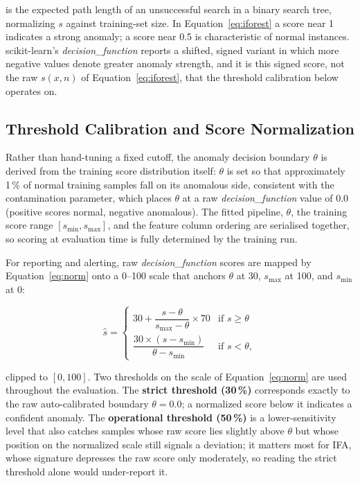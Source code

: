 \noindent is the expected path length of an unsuccessful search in a binary search tree, normalizing $s$ against training-set size. In Equation~\eqref{eq:iforest} a score near 1 indicates a strong anomaly; a score near 0.5 is characteristic of normal instances. scikit-learn's \textit{decision\_function} reports a shifted, signed variant in which more negative values denote greater anomaly strength, and it is this signed score, not the raw $s(x,n)$ of Equation~\eqref{eq:iforest}, that the threshold calibration below operates on.

\subsection{Threshold Calibration and Score Normalization}

Rather than hand-tuning a fixed cutoff, the anomaly decision boundary $\theta$ is derived from the training score distribution itself: $\theta$ is set so that approximately 1\,\% of normal training samples fall on its anomalous side, consistent with the contamination parameter, which places $\theta$ at a raw \textit{decision\_function} value of $0.0$ (positive scores normal, negative anomalous). The fitted pipeline, $\theta$, the training score range $[s_{\min}, s_{\max}]$, and the feature column ordering are serialised together, so scoring at evaluation time is fully determined by the training run.

For reporting and alerting, raw \textit{decision\_function} scores are mapped by Equation~\eqref{eq:norm} onto a 0--100 scale that anchors $\theta$ at 30, $s_{\max}$ at 100, and $s_{\min}$ at 0:

\begin{equation}
\label{eq:norm}
\hat{s} =
\begin{cases}
30 + \dfrac{s - \theta}{s_{\max} - \theta} \times 70 & \text{if } s \ge \theta \\[8pt]
\dfrac{30 \times (s - s_{\min})}{\theta - s_{\min}} & \text{if } s < \theta,
\end{cases}
\end{equation}

\noindent clipped to $[0, 100]$. Two thresholds on the scale of Equation~\eqref{eq:norm} are used throughout the evaluation. The \textbf{strict threshold (30\,\%)} corresponds exactly to the raw auto-calibrated boundary $\theta = 0.0$; a normalized score below it indicates a confident anomaly. The \textbf{operational threshold (50\,\%)} is a lower-sensitivity level that also catches samples whose raw score lies slightly above $\theta$ but whose position on the normalized scale still signals a deviation; it matters most for IFA, whose signature depresses the raw score only moderately, so reading the strict threshold alone would under-report it.

